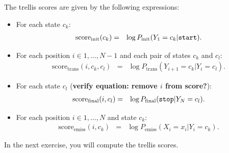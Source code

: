 The trellis scores are given by the following expressions:
\begin{itemize}
\item For each state $c_k$:
\begin{eqnarray}
\mathrm{score}_{\mathrm{init}}(c_k) &=&
\log P_{\mathrm{init}}(Y_{1} = c_k | \text{\tt start}).
\end{eqnarray}
\item For each position $i \in {1,\ldots,N-1}$ and each pair of states $c_k$ and $c_l$:
\begin{eqnarray}
\mathrm{score}_{\mathrm{trans}}(i, c_k, c_l) &=&
\log P_{\mathrm{trans}}(Y_{i+1} = c_k | Y_i = c_l).
\end{eqnarray}
\item For each state $c_l$ (\textbf{verify equation: remove $i$ from score?}):
\begin{eqnarray}
\mathrm{score}_{\mathrm{final}}(i, c_l) &=&
\log P_{\mathrm{final}}(\text{\tt stop} | Y_N = c_l).
\end{eqnarray}
\item For each position $i \in {1,\ldots,N}$ and state $c_k$:
\begin{eqnarray}
\mathrm{score}_{\mathrm{emiss}}(i, c_k) &=&
\log P_{\mathrm{emiss}}(X_i = x_i | Y_i = c_k).
\end{eqnarray}
\end{itemize}

In the next exercise, you will compute the trellis scores.

